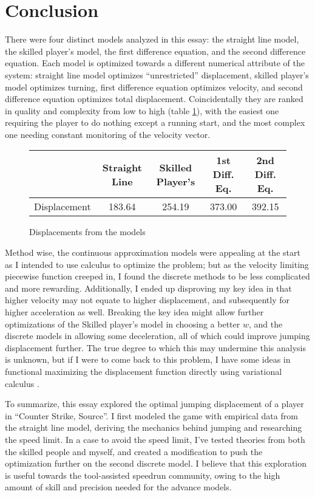 

\section{Conclusion}
There were four distinct models analyzed in this essay: the straight line model, the skilled player's model, the first difference equation, and the second difference equation. Each model is optimized towards a different numerical attribute of the system: straight line model optimizes ``unrestricted'' displacement, skilled player's model optimizes turning, first difference equation optimizes velocity, and second difference equation optimizes total displacement. Coincidentally they are ranked in quality and complexity from low to high (table \ref{tbl:dis}), with the easiest one requiring the player to do nothing except a running start, and the most complex one needing constant monitoring of the velocity vector.

\begin{figure}[H]
    \centering
    \begin{tabular}{|c|c|c|c|c|}
        \hline
        & Straight Line & Skilled Player's & 1st Diff. Eq. & 2nd Diff. Eq.\\
        \hline
        Displacement & 183.64  & 254.19 & 373.00 & 392.15 \\
        \hline
    \end{tabular}
    \caption{Displacements from the models}
    \label{tbl:dis}
\end{figure}

Method wise, the continuous approximation models were appealing at the start as I intended to use calculus to optimize the problem; but as the velocity limiting piecewise function creeped in, I found the discrete methods to be less complicated and more rewarding. Additionally, I ended up disproving my key idea in that higher velocity may not equate to higher displacement, and subsequently for higher acceleration as well. Breaking the key idea might allow further optimizations of the Skilled player's model in choosing a better $w$, and the discrete models in allowing some deceleration, all of which could improve jumping displacement further. The true degree to which this may undermine this analysis is unknown, but if I were to come back to this problem, I have some ideas in functional maximizing the displacement function directly using variational calculus .

To summarize, this essay explored the optimal jumping displacement of a player in ``Counter Strike, Source''. I first modeled the game with empirical data from the straight line model, deriving the mechanics behind jumping and researching the speed limit. In a case to avoid the speed limit, I've tested theories from both the skilled people and myself, and created a modification to push the optimization further on the second discrete model. I believe that this exploration is useful towards the tool-assisted speedrun community, owing to the high amount of skill and precision needed for the advance models.

